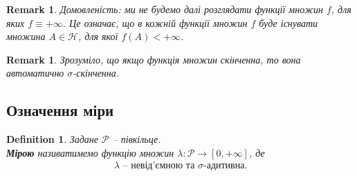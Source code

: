 \documentclass[a4paper, 10pt]{article}
\theoremstyle{theoremdd}
\newtheorem{definition}[theorem]{Definition}
\newtheorem{remark}[theorem]{Remark}
\begin{document}
\begin{remark}
Домовленість: ми не будемо далі розглядати функції множин $f$, для яких $f \equiv +\infty$. Це означає, що в кожній функції множин $f$ буде існувати множина $A \in \mathcal{H}$, для якої $f(A) < +\infty$.
\end{remark}

\begin{remark}
Зрозуміло, що якщо функція множин скінченна, то вона автоматично $\sigma$-скінченна.
\end{remark}

\subsection{Означення міри}
\begin{definition}
Задане $\mathcal{P}$ -- півкільце.\\
\textbf{Мірою} називатимемо функцію множин $\lambda \colon \mathcal{P} \to [0,+\infty]$, де 
\begin{align*}
\lambda \text{ -- невід'ємною та $\sigma$-адитивна.}
\end{align*}
\end{definition}
\end{document}
